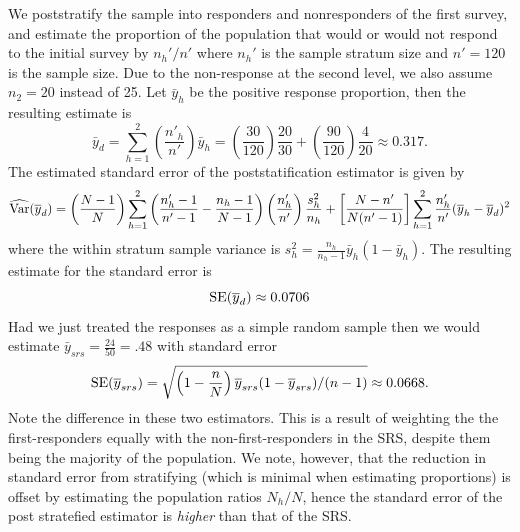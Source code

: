 \documentclass[usenames,dvipsnames]{homework}
\begin{document}
\begin{solution}
  We poststratify the sample into responders and nonresponders of the first
survey, and estimate the proportion of the population that would or would not
respond to the initial survey by $n_h'/n'$ where $n_h'$ is the sample stratum
size  and $n'=120$ is the sample size.  Due to the non-response at the second level,
we also assume $n_2 = 20$ instead of 25. Let $\bar y_h$ be the positive response proportion,
then the resulting estimate is
$$
  \bar y_d = \sum_{h=1}^2 \left( \frac{n'_h}{n'} \right) \bar y_h = \left( \frac{30}{120} \right) \frac{20}{30} + \left(\frac{90}{120}\right)\frac{4}{20} \approx 0.317.
$$
The estimated standard error of the poststatification estimator is given by
$$
  \widehat{\mathrm{Var}}(\overline y_d) = \left(\frac{N-1}{N}\right)\sum_{h=1}^2 \left(\frac{n_h'-1}{n'-1} - \frac{n_h-1}{N-1}\right) \left(\frac{n_h'}{n'}\right) \frac{s_h^2}{n_h} + \left[\frac{N - n'}{N(n'-1)}\right] \sum_{h=1}^2 \frac{n_h'}{n'} (\overline y_h - \overline y_d)^2
$$
where the within stratum sample variance is $ s_h^2 = \frac{n_h}{n_h-1}  \bar y_h(1-\bar y_h) $.
The resulting estimate for the standard error is
$$
  \mathrm{SE}(\overline y_d) \approx 0.0706 
$$
Had we just treated the responses as a simple random sample then we would estimate $\bar y_{srs} = \frac {24}{50} = .48$ with standard error 
$$
  \mathrm{SE}(\overline y_{srs}) = \sqrt{\left(1 - \frac nN\right) \overline y_{srs}(1-\overline y_{srs})/(n-1)} \approx 0.0668.
$$ 
Note the difference in these two estimators.  This is a result of weighting the the first-responders equally with the non-first-responders in the SRS, despite them being the majority of the population.  We note, however, that the reduction in standard error from stratifying (which is minimal when estimating proportions) is offset by estimating the population ratios $N_h/N$, hence the standard error of the post stratefied estimator is \emph{higher} than that of the SRS.

\end{solution}
\end{document}
